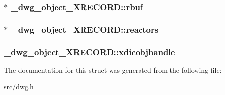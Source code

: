 \hypertarget{struct__dwg__object__XRECORD_ae4e365922cfd903c2fef6ccfc53b392c}{
\subsubsection[{rbuf}]{$\ast$ {\bf \-\_\-dwg\-\_\-object\-\_\-\-X\-R\-E\-C\-O\-R\-D\-::rbuf}}}\label{struct__dwg__object__XRECORD_ae4e365922cfd903c2fef6ccfc53b392c}
\hypertarget{struct__dwg__object__XRECORD_a913efeae1ca628d7a4ff1cb31f3aebbd}{
\subsubsection[{reactors}]{$\ast$ {\bf \-\_\-dwg\-\_\-object\-\_\-\-X\-R\-E\-C\-O\-R\-D\-::reactors}}}\label{struct__dwg__object__XRECORD_a913efeae1ca628d7a4ff1cb31f3aebbd}
\hypertarget{struct__dwg__object__XRECORD_a92b0370480cc86ef1a384a49452620b1}{
\subsubsection[{xdicobjhandle}]{ {\bf \-\_\-dwg\-\_\-object\-\_\-\-X\-R\-E\-C\-O\-R\-D\-::xdicobjhandle}}}\label{struct__dwg__object__XRECORD_a92b0370480cc86ef1a384a49452620b1}


\-The documentation for this struct was generated from the following file\-:\begin{DoxyCompactItemize}
\item 
src/\hyperlink{dwg_8h}{dwg.\-h}\end{DoxyCompactItemize}
